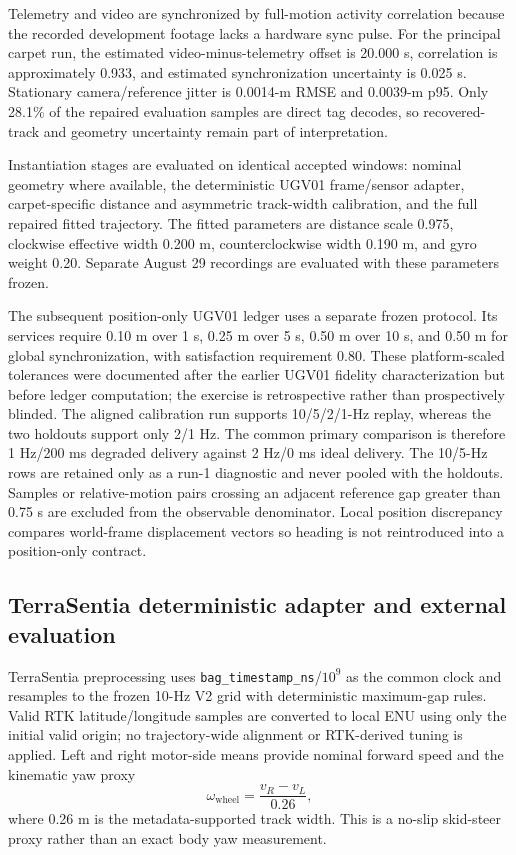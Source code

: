 \documentclass[journal,onecolumn]{IEEEtran}
\begin{document}
Telemetry and video are synchronized by full-motion activity correlation because the recorded development footage lacks a hardware sync pulse. For the principal carpet run, the estimated video-minus-telemetry offset is 20.000 s, correlation is approximately 0.933, and estimated synchronization uncertainty is 0.025 s. Stationary camera/reference jitter is 0.0014-m RMSE and 0.0039-m p95. Only 28.1\% of the repaired evaluation samples are direct tag decodes, so recovered-track and geometry uncertainty remain part of interpretation.

Instantiation stages are evaluated on identical accepted windows: nominal geometry where available, the deterministic UGV01 frame/sensor adapter, carpet-specific distance and asymmetric track-width calibration, and the full repaired fitted trajectory. The fitted parameters are distance scale 0.975, clockwise effective width 0.200 m, counterclockwise width 0.190 m, and gyro weight 0.20. Separate August 29 recordings are evaluated with these parameters frozen.

The subsequent position-only UGV01 ledger uses a separate frozen protocol. Its services require 0.10 m over 1 s, 0.25 m over 5 s, 0.50 m over 10 s, and 0.50 m for global synchronization, with satisfaction requirement 0.80. These platform-scaled tolerances were documented after the earlier UGV01 fidelity characterization but before ledger computation; the exercise is retrospective rather than prospectively blinded. The aligned calibration run supports 10/5/2/1-Hz replay, whereas the two holdouts support only 2/1 Hz. The common primary comparison is therefore 1 Hz/200 ms degraded delivery against 2 Hz/0 ms ideal delivery. The 10/5-Hz rows are retained only as a run-1 diagnostic and never pooled with the holdouts. Samples or relative-motion pairs crossing an adjacent reference gap greater than 0.75 s are excluded from the observable denominator. Local position discrepancy compares world-frame displacement vectors so heading is not reintroduced into a position-only contract.

\subsection{TerraSentia deterministic adapter and external evaluation}
TerraSentia preprocessing uses \texttt{bag\_timestamp\_ns}/$10^9$ as the common clock and resamples to the frozen 10-Hz V2 grid with deterministic maximum-gap rules. Valid RTK latitude/longitude samples are converted to local ENU using only the initial valid origin; no trajectory-wide alignment or RTK-derived tuning is applied. Left and right motor-side means provide nominal forward speed and the kinematic yaw proxy
\begin{equation}
\omega_{\mathrm{wheel}}=\frac{v_R-v_L}{0.26},
\end{equation}
where 0.26 m is the metadata-supported track width. This is a no-slip skid-steer proxy rather than an exact body yaw measurement.
\end{document}
